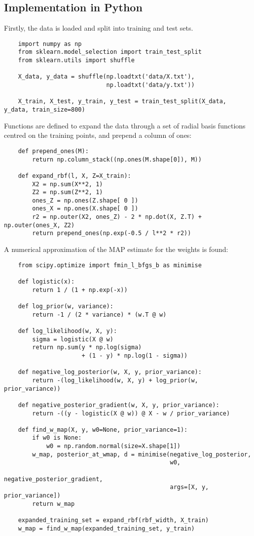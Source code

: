 \documentclass[a4paper]{article}
\begin{document}
    \subsection{Implementation in Python}
    Firstly, the data is loaded and split into training and test sets.
    \begin{verbatim}
    import numpy as np
    from sklearn.model_selection import train_test_split
    from sklearn.utils import shuffle

    X_data, y_data = shuffle(np.loadtxt('data/X.txt'),
                             np.loadtxt('data/y.txt'))

    X_train, X_test, y_train, y_test = train_test_split(X_data, y_data, train_size=800)
    \end{verbatim}
    Functions are defined to expand the data through a set of radial basis functions centred on the training points, and prepend a column of ones:
    \begin{verbatim}
    def prepend_ones(M):
        return np.column_stack((np.ones(M.shape[0]), M))

    def expand_rbf(l, X, Z=X_train):
        X2 = np.sum(X**2, 1)
        Z2 = np.sum(Z**2, 1)
        ones_Z = np.ones(Z.shape[ 0 ])
        ones_X = np.ones(X.shape[ 0 ])
        r2 = np.outer(X2, ones_Z) - 2 * np.dot(X, Z.T) + np.outer(ones_X, Z2)
        return prepend_ones(np.exp(-0.5 / l**2 * r2))
    \end{verbatim}
    A numerical approximation of the MAP estimate for the weights is found:
    \begin{verbatim}
    from scipy.optimize import fmin_l_bfgs_b as minimise

    def logistic(x):
        return 1 / (1 + np.exp(-x))

    def log_prior(w, variance):
        return -1 / (2 * variance) * (w.T @ w)

    def log_likelihood(w, X, y):
        sigma = logistic(X @ w)
        return np.sum(y * np.log(sigma)
                      + (1 - y) * np.log(1 - sigma))

    def negative_log_posterior(w, X, y, prior_variance):
        return -(log_likelihood(w, X, y) + log_prior(w, prior_variance))

    def negative_posterior_gradient(w, X, y, prior_variance):
        return -((y - logistic(X @ w)) @ X - w / prior_variance)

    def find_w_map(X, y, w0=None, prior_variance=1):
        if w0 is None:
            w0 = np.random.normal(size=X.shape[1])
        w_map, posterior_at_wmap, d = minimise(negative_log_posterior,
                                               w0,
                                               negative_posterior_gradient,
                                               args=[X, y, prior_variance])
        return w_map

    expanded_training_set = expand_rbf(rbf_width, X_train)
    w_map = find_w_map(expanded_training_set, y_train)
    \end{verbatim}
\end{document}
